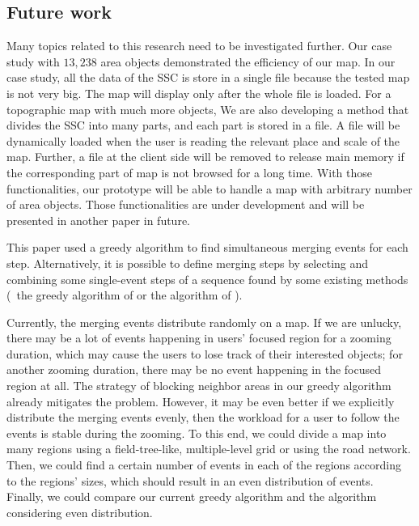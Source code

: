 \documentclass[twocolumn]{svjour3}          %
\begin{document}
\subsection{Future work}

Many topics related to this research need to be investigated further.
Our case study with $13{,}238$ area objects 
demonstrated the efficiency of our map.
In our case study, all the data of the SSC is store in a single file
because the tested map is not very big.
The map will display only after the whole file is loaded.
For a topographic map with much more objects,
We are also developing a method that divides the SSC into many parts, 
and each part is stored in a file.
A file will be dynamically loaded when the user is reading the relevant place and scale of the map.
Further, a file at the client side will be removed to release main memory
if the corresponding part of map is not browsed for a long time. 
With those functionalities, our prototype will be able to handle 
a map with arbitrary number of area objects.
Those functionalities are under development 
and will be presented in another paper in future.






This paper used a greedy algorithm 
to find simultaneous merging events for each step.
Alternatively, it is possible to define merging steps 
by selecting and combining some single-event steps of a sequence found 
by some existing methods
(\eg~the greedy algorithm of \citet{vanOosterom2005}
or the \Astar algorithm of \citet{Peng2020AreaAgg}).

Currently, the merging events distribute randomly on a map.
If we are unlucky, there may be a lot of events 
happening in users' focused region for a zooming duration,
which may cause the users to lose track of their interested objects;
for another zooming duration, 
there may be no event happening in the focused region at all.
The strategy of blocking neighbor areas in our greedy algorithm 
already mitigates the problem.
However, it may be even better if 
we explicitly distribute the merging events evenly, 
then the workload for a user to follow the events is stable during the zooming.
To this end, we could divide a map into many regions 
using a field-tree-like, multiple-level grid \citep{vanPutten1998NewGAP}
or using the road network.
Then, we could find a certain number of events in each of the regions 
according to the regions' sizes,
which should result in an even distribution of events.
Finally, we could compare our current greedy algorithm and 
the algorithm considering even distribution.
\end{document}
